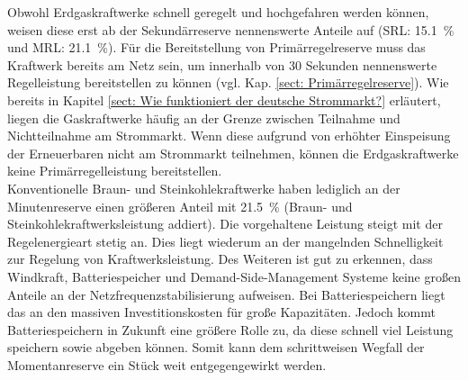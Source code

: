 			Obwohl Erdgaskraftwerke schnell geregelt und hochgefahren werden können, weisen diese erst ab der Sekundärreserve nennenswerte Anteile auf (SRL: \SI{15,1}{\percent} und MRL: \SI{21,1}{\percent}).
			Für die Bereitstellung von Primärregelreserve muss das Kraftwerk bereits am Netz sein, um innerhalb von \num{30} Sekunden nennenswerte Regelleistung bereitstellen zu können (vgl. Kap. \ref{sect: Primärregelreserve}). 
			Wie bereits in Kapitel \ref{sect: Wie funktioniert der deutsche Strommarkt?} erläutert, liegen die Gaskraftwerke häufig an der Grenze zwischen Teilnahme und Nichtteilnahme am Strommarkt.  
			Wenn diese aufgrund von erhöhter Einspeisung der Erneuerbaren nicht am Strommarkt teilnehmen, können die Erdgaskraftwerke keine Primärregelleistung bereitstellen. \\
			
			Konventionelle Braun- und Steinkohlekraftwerke haben lediglich an der Minutenreserve einen größeren Anteil mit \SI{21,5}{\percent} (Braun- und Steinkohlekraftwerksleistung addiert).
			Die vorgehaltene Leistung steigt mit der Regelenergieart stetig an.
			Dies liegt wiederum an der mangelnden Schnelligkeit zur Regelung von Kraftwerksleistung. 
			Des Weiteren ist gut zu erkennen, dass Windkraft, Batteriespeicher und Demand-Side-Management Systeme keine großen Anteile an der Netzfrequenzstabilisierung aufweisen. 
			Bei Batteriespeichern liegt das an den massiven Investitionskosten für große Kapazitäten. 
			Jedoch kommt Batteriespeichern in Zukunft eine größere Rolle zu, da diese schnell viel Leistung speichern sowie abgeben können.
			Somit kann dem schrittweisen Wegfall der Momentanreserve ein Stück weit entgegengewirkt werden. 
			
